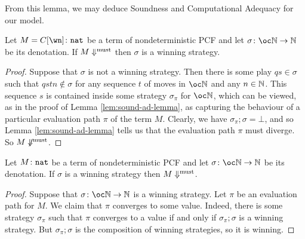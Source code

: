 \documentclass{article}
\begin{document}
From this lemma, we may deduce Soundness and Computational Adequacy for our model.

\begin{proposition}[Soundness]
  Let $M=C[\wn]\from \nat$ be a term of nondeterministic PCF and let $\sigma\from\oc \bN \to\bN$ be its denotation.  If $M\Downarrow^{\text{must}}$ then $\sigma$ is a winning strategy.
\end{proposition}

\begin{proof}
  Suppose that $\sigma$ is not a winning strategy.  
  Then there is some play $qs\in\sigma$ such that $qstn\not\in\sigma$ for any sequence $t$ of moves in $\oc\bN$ and any $n\in\mathbb{N}$.  
  This sequence $s$ is contained inside some strategy $\sigma_\pi$ for $\oc\bN$, which can be viewed, as in the proof of Lemma \ref{lem:sound-ad-lemma}, as capturing the behaviour of a particular evaluation path $\pi$ of the term $M$.  
  Clearly, we have $\sigma_\pi;\sigma=\bot$, and so Lemma \ref{lem:sound-ad-lemma} tells us that the evaluation path $\pi$ must diverge.  
  So $M\not\Downarrow^{\text{must}}$.
\end{proof}

\begin{proposition}
  Let $M\colon {\mathtt{nat}}$ be a term of nondeterministic PCF and let $\sigma\from\oc \bN \to\bN$ be its denotation.  If $\sigma$ is a winning strategy then $M\Downarrow^{\text{must}}$.
\end{proposition}

\begin{proof}
  Suppose that $\sigma\from\oc \bN\to \bN$ is a winning strategy.  
  Let $\pi$ be an evaluation path for $M$.  
  We claim that $\pi$ converges to some value.  
  Indeed, there is some strategy $\sigma_\pi$ such that $\pi$ converges to a value if and only if $\sigma_\pi;\sigma$ is a winning strategy.  
  But $\sigma_\pi;\sigma$ is the composition of winning strategies, so it is winning.
\end{proof}



\end{document}
